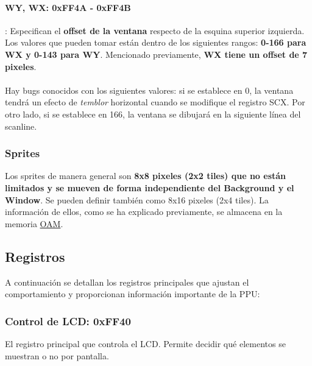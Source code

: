 \clearpage

\paragraph{WY, WX: 0xFF4A - 0xFF4B}: Especifican el \textbf{offset de la ventana} respecto de la esquina superior izquierda. Los valores que pueden tomar están dentro de los siguientes rangos: \textbf{0-166 para WX y 0-143 para WY}. Mencionado previamente, \textbf{WX tiene un offset de 7 pixeles}. 
\\\\
Hay bugs conocidos con los siguientes valores: si se establece en 0, la ventana tendrá un efecto de \textit{temblor} horizontal cuando se modifique el registro SCX. Por otro lado, si se establece en 166, la ventana se dibujará en la siguiente línea del scanline.

\subsubsection{Sprites}

Los sprites de manera general son \textbf{8x8 pixeles (2x2 tiles) que no están limitados y se mueven de forma independiente del Background y el Window}. Se pueden definir también como 8x16 pixeles (2x4 tiles). La información de ellos, como se ha explicado previamente, se almacena en la memoria \hyperref[mem:oam]{OAM}.

\subsection{Registros}

A continuación se detallan los registros principales que ajustan el comportamiento y proporcionan información importante de la PPU:
\subsubsection{Control de LCD: 0xFF40} \label{lcd_control}

El registro principal que controla el LCD. Permite decidir qué elementos se muestran o no por pantalla.

